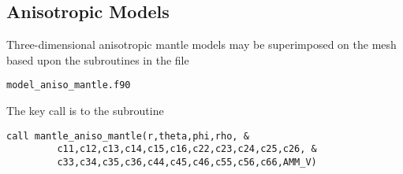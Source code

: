 \subsection{Anisotropic Models}\label{sub:Anisotropic-Models}

Three-dimensional anisotropic mantle models may be superimposed on
the mesh based upon the subroutines in the file
\begin{verbatim}
model_aniso_mantle.f90
\end{verbatim}

The key call is to the subroutine
\begin{verbatim}
call mantle_aniso_mantle(r,theta,phi,rho, &
         c11,c12,c13,c14,c15,c16,c22,c23,c24,c25,c26, &
         c33,c34,c35,c36,c44,c45,c46,c55,c56,c66,AMM_V)
\end{verbatim}

